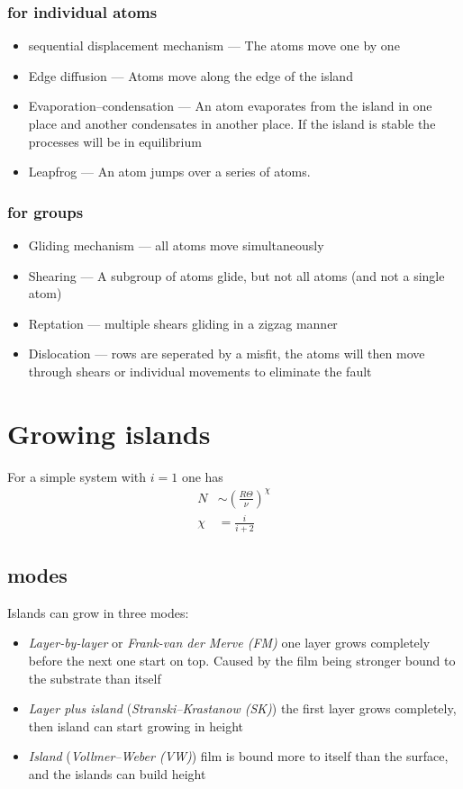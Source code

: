 \documentclass[article,oneside]{memoir}
\begin{document}
\subsection{for individual atoms}
\begin{itemize}
        \item sequential displacement mechanism --- The atoms move one by one
        \item Edge diffusion --- Atoms move along the edge of the island
        \item Evaporation--condensation --- An atom evaporates from the island in one place and another condensates in another place. If the island is stable the processes will be in equilibrium
        \item Leapfrog --- An atom jumps over a series of atoms.
\end{itemize}

\subsection{for groups}
\begin{itemize}
        \item Gliding mechanism --- all atoms move simultaneously
        \item Shearing --- A subgroup of atoms glide, but not all atoms (and not a single atom)
        \item Reptation --- multiple shears gliding in a zigzag manner
        \item Dislocation --- rows are seperated by a misfit, the atoms will then move through shears or individual movements to eliminate the fault
\end{itemize}


\chapter{Growing islands}
For a simple system with $i=1$ one has
\begin{align*}
        N&\sim\left( \frac{R\Theta}{\nu} \right)^\chi\\
        \chi&=\frac{i}{i+2}
\end{align*}
\section{modes}
Islands can grow in three modes:
\begin{itemize}
        \item \emph{Layer-by-layer} or \emph{Frank-van der Merve (FM)} one layer grows completely before the next one start on top. Caused by the film being stronger bound to the substrate than itself
        \item \emph{Layer plus island} (\emph{Stranski--Krastanow (SK)}) the first layer grows completely, then island can start growing in height
        \item \emph{Island} (\emph{Vollmer--Weber (VW)}) film is bound more to itself than the surface, and the islands can build height
\end{itemize}
\end{document}
